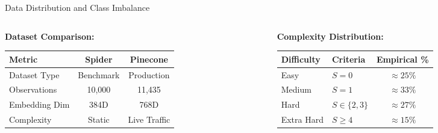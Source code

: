 \documentclass[9pt]{beamer}
\begin{document}
\begin{frame}{Data Distribution and Class Imbalance}
    \begin{columns}[t]
        \begin{column}{0.5\textwidth}
            \textbf{Dataset Comparison:}
            \vspace{0.1cm}
            \begin{table}
                \centering
                \scriptsize
                \begin{tabular}{lcc}
                    \hline
                    \textbf{Metric} & \textbf{Spider} & \textbf{Pinecone} \\ \hline
                    Dataset Type & Benchmark & Production \\
                    Observations & 10,000 & 11,435 \\
                    Embedding Dim & 384D & 768D \\
                    Complexity & Static & Live Traffic \\ \hline
                \end{tabular}
            \end{table}
        \end{column}
        
        \begin{column}{0.5\textwidth}
            \textbf{Complexity Distribution:}
            \vspace{0.1cm}
            \begin{table}
                \centering
                \scriptsize
                \begin{tabular}{llc}
                    \hline
                    \textbf{Difficulty} & \textbf{Criteria} & \textbf{Empirical \%} \\ \hline
                    Easy & $S = 0$ & $\approx 25\%$ \\
                    Medium & $S = 1$ & $\approx 33\%$ \\
                    Hard & $S \in \{2, 3\}$ & $\approx 27\%$ \\
                    Extra Hard & $S \ge 4$ & $\approx 15\%$ \\ \hline
                \end{tabular}
            \end{table}
        \end{column}
    \end{columns}
    

\end{frame}
\end{document}
